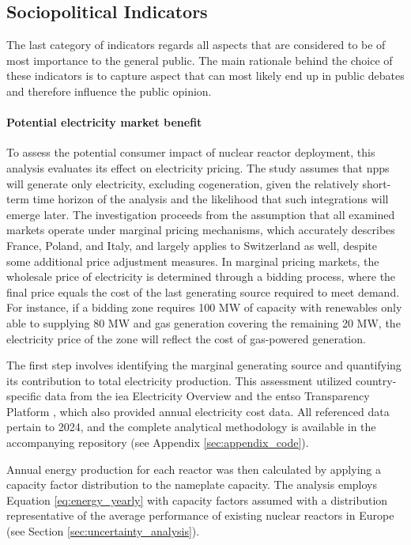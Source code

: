 \subsection{Sociopolitical Indicators}
The last category of indicators regards all aspects that are considered to be of most importance to the general public. The main rationale behind the choice of these indicators is to capture aspect that can most likely end up in public debates and therefore influence the public opinion.

\paragraph{Potential electricity market benefit}
\label{sec:red_elect_price}
To assess the potential consumer impact of nuclear reactor deployment, this analysis evaluates its effect on electricity pricing. The study assumes that \glspl{npp} will generate only electricity, excluding cogeneration, given the relatively short-term time horizon of the analysis and the likelihood that such integrations will emerge later.  The investigation proceeds from the assumption that all examined markets operate under marginal pricing mechanisms, which accurately describes France, Poland, and Italy, and largely applies to Switzerland as well, despite some additional price adjustment measures. In marginal pricing markets, the wholesale price of electricity is determined through a bidding process, where the final price equals the cost of the last generating source required to meet demand. For instance, if a bidding zone requires 100 MW of capacity with renewables only able to supplying 80 MW and gas generation covering the remaining 20 MW, the electricity price of the zone will reflect the cost of gas-powered generation.


The first step involves identifying the marginal generating source and quantifying its contribution to total electricity production. This assessment utilized country-specific data from the \gls{iea} Electricity Overview \cite{IEA_Electricity_2024} and the \gls{entso} Transparency Platform \cite{ENTSOE_Transparency_2025}, which also provided annual electricity cost data. All referenced data pertain to 2024, and the complete analytical methodology is available in the accompanying repository (see Appendix \ref{sec:appendix_code}).

Annual energy production for each reactor was then calculated by applying a capacity factor distribution to the nameplate capacity. The analysis employs Equation \ref{eq:energy_yearly} with capacity factors assumed with a distribution representative of the average performance of existing nuclear reactors in Europe (see Section \ref{sec:uncertainty_analysis}).


